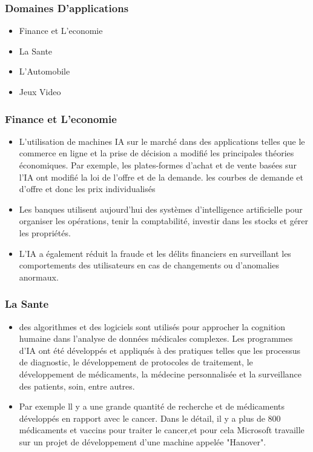 \documentclass{beamer}
\begin{document}
	
 	\begin{frame}
 	   \frametitle{Domaines D'applications}
 	   \begin{itemize}
 	    \item Finance et L'economie
 	    \item La Sante
 	    \item L'Automobile
 	    \item Jeux Video
 	   \end{itemize}
 	\end{frame}
 	
 	
 	\begin{frame}
 	   \frametitle{Finance et L'economie}
 	        \begin{itemize}
 	            \item L'utilisation de machines IA sur le marché dans des applications telles que le commerce en ligne et la prise de décision a modifié les principales théories économiques. Par exemple, les plates-formes d'achat et de vente basées sur l'IA ont modifié la loi de l'offre et de la demande. les courbes de demande et d'offre et donc les prix individualisés
 	            
 	            \item Les banques utilisent aujourd'hui des systèmes d'intelligence artificielle pour organiser les opérations, tenir la comptabilité, investir dans les stocks et gérer les propriétés.
 	           
 	            \item L'IA a également réduit la fraude et les délits financiers en surveillant les comportements des utilisateurs en cas de changements ou d'anomalies anormaux.
 	        \end{itemize}
 	\end{frame}
 	
 	
 	\begin{frame}
 	   \frametitle{La Sante}
 	   \begin{itemize}
 	       \item des algorithmes et des logiciels sont utilisés pour approcher la cognition humaine dans l'analyse de données médicales complexes. Les programmes d'IA ont été développés et appliqués à des pratiques telles que les processus de diagnostic, le développement de protocoles de traitement, le développement de médicaments, la médecine personnalisée et la surveillance des patients, soin, entre autres.
 	       
 	       \item Par exemple ll y a une grande quantité de recherche et de médicaments développés en rapport avec le cancer. Dans le détail, il y a plus de 800 médicaments et vaccins pour traiter le cancer,et pour cela  Microsoft travaille sur un projet de développement d'une machine appelée "Hanover".
 	       
 	   \end{itemize}
 	\end{frame}
 	
\end{document}
